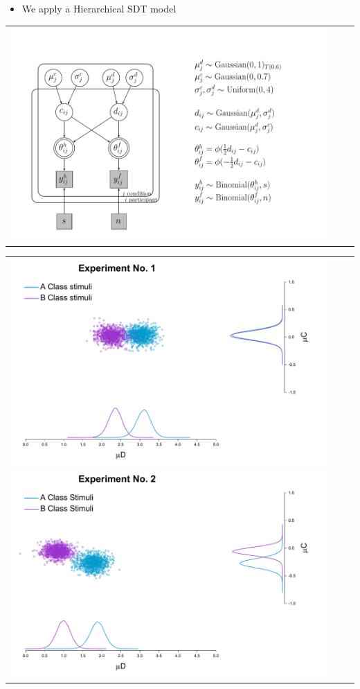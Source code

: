 \documentclass[final]{beamer}
\newlength{\onecolwid}
\newlength{\twocolwid}
\begin{document}
\begin{frame}[t]
\begin{columns}[t]
\begin{column}{\twocolwid}
\begin{columns}[t,totalwidth=\twocolwid]
\begin{column}{\onecolwid}
\begin{alertblock}{}

\begin{itemize}
\item We apply a Hierarchical SDT model
\end{itemize}
\begin{center}
\begin{tabular}{ccc}
\includegraphics[width=0.75\linewidth]{Figures/0_HierarchicalSDT.pdf}
\end{tabular}
\end{center}

\begin{center}
\begin{tabular}{ccc}
\includegraphics[width=0.5\linewidth]{Figures/0-Exp1.pdf} \includegraphics[width=0.5\linewidth]{Figures/0-Exp2.pdf}
\end{tabular}
\end{center}


\end{alertblock}
\end{column}
\end{columns}
\end{column}
\end{columns}
\end{frame}
\end{document}
